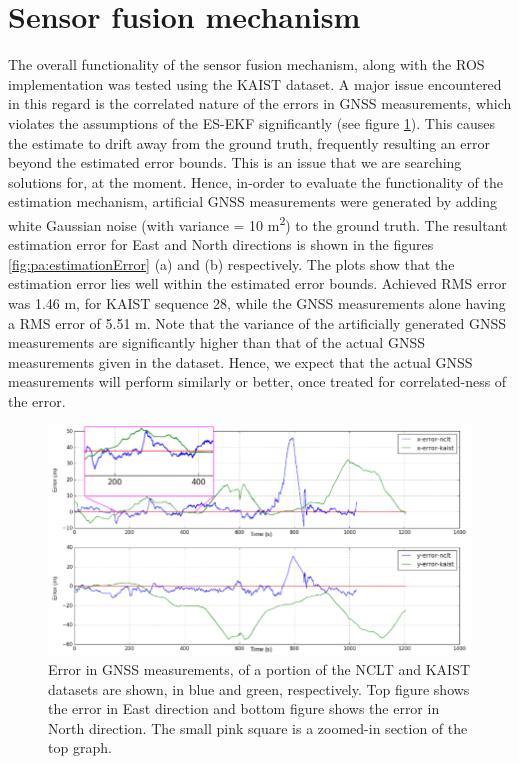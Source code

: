 \section{Sensor fusion mechanism}
The overall functionality of the sensor fusion mechanism, along with the \gls{ROS} implementation was tested using the \gls{KAIST} dataset. A major issue encountered in this regard is the correlated nature of the errors in \gls{GNSS} measurements, which violates the assumptions of the \gls{ES-EKF} significantly (see figure \ref{fig:pa:colouredGNSS}). This causes the estimate to drift away from the ground truth, frequently resulting an error beyond the estimated error bounds. This is an issue that we are searching solutions for, at the moment. Hence, in-order to evaluate the functionality of the estimation mechanism, artificial \gls{GNSS} measurements were generated by adding white Gaussian noise (with variance = 10 m\textsuperscript{2}) to the ground truth. The resultant estimation error for East and North directions is shown in the figures \ref{fig:pa:estimationError} (a) and (b) respectively. The plots show that the estimation error lies well within the estimated error bounds. Achieved \gls{RMS} error was 1.46 m, for \gls{KAIST} sequence 28, while the \gls{GNSS} measurements alone having a \gls{RMS} error of 5.51 m. Note that the variance of the artificially generated \gls{GNSS} measurements are significantly higher than that of the actual \gls{GNSS} measurements given in the dataset. Hence, we expect that the actual \gls{GNSS} measurements will perform similarly or better, once treated for correlated-ness of the error.
\begin{figure}[htp]
	\centering
	\includegraphics[width=\textwidth]{figs/coloured_gnss.png}
	\vspace{-0.5cm}
	\caption[Nature of GNSS errors]{Error in GNSS measurements, of a portion of the NCLT and KAIST datasets are shown, in blue and green, respectively. Top figure shows the error in East direction and bottom figure shows the error in North direction. The small pink square is a zoomed-in section of the top graph.}
	\label{fig:pa:colouredGNSS}
	\vspace{0.5cm}
\end{figure}
